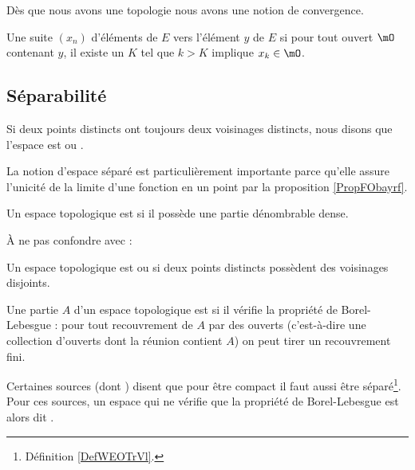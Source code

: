 Dès que nous avons une topologie nous avons une notion de convergence.
\begin{definition} \label{DefXSnbhZX}
    Une suite $(x_n)$ d'éléments de $E$  vers l'élément $y$ de $E$ si pour tout ouvert $\mO$ contenant $y$, il existe un $K$ tel que $k>K$ implique $x_k\in\mO$. 
\end{definition}

\subsection{Séparabilité}

\begin{definition}  \label{DefYFmfjjm}
    Si deux points distincts ont toujours deux voisinages distincts, nous disons que l'espace est  ou .
\end{definition}
La notion d'espace séparé est particulièrement importante parce qu'elle assure l'unicité de la limite d'une fonction en un point par la proposition \ref{PropFObayrf}.

\begin{definition}  \label{DefUADooqilFK}
    Un espace topologique est  si il possède une partie dénombrable dense.
\end{definition}
À ne pas confondre avec :
\begin{definition}  \label{DefWEOTrVl}
    Un espace topologique est  ou  si deux points distincts possèdent des voisinages disjoints.
\end{definition}

\begin{definition}  \label{DefJJVsEqs}
  Une partie $A$ d'un espace topologique est  si il vérifie la propriété de Borel-Lebesgue : pour tout recouvrement de $A$ par des ouverts (c'est-à-dire une collection d'ouverts dont la réunion contient $A$) on peut tirer un recouvrement fini.
\end{definition}
\begin{remark}
    Certaines sources (dont ) disent que pour être compact il faut aussi être séparé\footnote{Définition \ref{DefWEOTrVl}.}. Pour ces sources, un espace qui ne vérifie que la propriété de Borel-Lebesgue est alors dit .
\end{remark}

